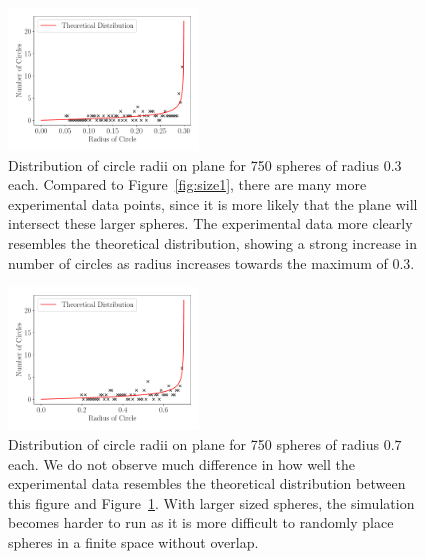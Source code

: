 \documentclass[journal]{IEEEtran}
\begin{document}
\begin{figure}[H]%
\begin{center}
\includegraphics[width=0.45\textwidth]{./../Figures/750_03.pdf}
\caption{Distribution of circle radii on plane for 750 spheres of radius $0.3$
  each. Compared to Figure~\ref{fig:size1}, there are many more experimental data
  points, since it is more likely that the plane will intersect these larger
  spheres. The experimental data more clearly resembles the theoretical
  distribution, showing a strong increase in number of circles as radius
  increases towards the maximum of 0.3.}\label{fig:size3}
\end{center}
\end{figure}

\begin{figure}[H]%
\begin{center}
\includegraphics[width=0.45\textwidth]{./../Figures/750_07.pdf}
\caption{Distribution of circle radii on plane for 750 spheres of radius $0.7$
  each. We do not observe much difference in how well the experimental data
  resembles the theoretical distribution between this figure and
  Figure~\ref{fig:size3}. With larger sized spheres, the simulation becomes harder
  to run as it is more difficult to randomly place spheres in a finite space
  without overlap.}\label{fig:size7}
\end{center}
\end{figure}
\end{document}
